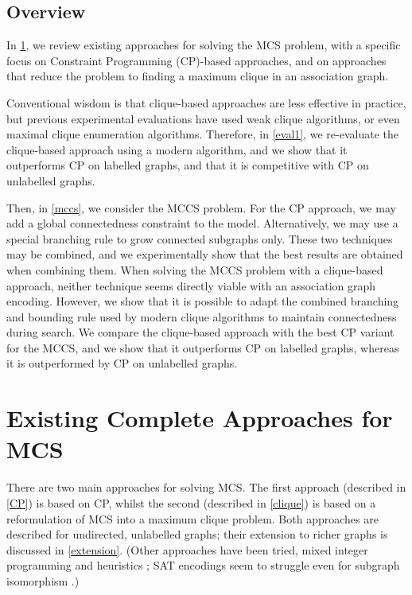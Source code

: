 \documentclass{llncs}
\begin{document}
\subsection{Overview}

In \cref{existing}, we review existing approaches for solving the MCS problem, with a specific focus
on Constraint Programming (CP)-based approaches, and on approaches that reduce the problem to
finding a maximum clique in an association graph.

Conventional wisdom is that clique-based approaches are less effective in practice, but previous
experimental evaluations have used weak clique algorithms, or even maximal clique enumeration
algorithms.  Therefore, in \cref{eval1}, we  re-evaluate the clique-based approach using a modern
algorithm, and we show that it outperforms CP on labelled graphs, and that it is competitive with CP
on unlabelled graphs.

Then, in \cref{mccs}, we consider the MCCS problem. For the CP approach, we may add a global
connectedness constraint to the model. Alternatively, we may use a special branching rule
\cite{DBLP:conf/mco/VismaraV08} to grow connected subgraphs only. These two techniques may
be combined, and we experimentally show that the best results are obtained when combining them.
When solving the MCCS problem with a clique-based approach, neither technique seems directly viable
with an association graph encoding.  However, we show that it is possible to adapt the combined
branching and bounding rule used by modern clique algorithms to maintain connectedness during
search.  We compare the clique-based approach with the best CP variant for the MCCS, and we show
that it outperforms CP on labelled graphs, whereas it is outperformed by CP on unlabelled graphs.

\section{Existing Complete Approaches for MCS}\label{existing}

There are two main approaches for solving MCS. The first approach (described in \cref{CP}) is based
on CP, whilst the second (described in \cref{clique}) is based on a reformulation of MCS into a
maximum clique problem. Both approaches are described for undirected, unlabelled graphs; their
extension to richer graphs is discussed in \cref{extension}.  (Other approaches have been tried,
mixed integer programming \cite{DBLP:journals/anor/PivaS12} and heuristics
\cite{DBLP:journals/jcisd/EnglertK15}; SAT encodings seem to struggle even for subgraph isomorphism
\cite{UpcomingIJCAIPaper}.)
\end{document}
